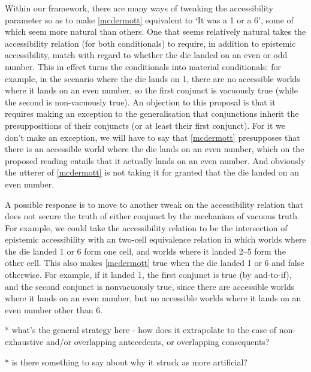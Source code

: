 \documentclass[If.tex]{subfiles}
\begin{document}
Within our framework, there are many ways of tweaking the accessibility parameter so as to make \ref{mcdermott} equivalent to ‘It was a 1 or a 6’, some of which seem more natural than others.  One that seems relatively natural takes the accessibility relation (for both conditionals) to require, in addition to epistemic accessibility, match with regard to whether the die landed on an even or odd number.  This in effect turns the conditionals into material conditionals: for example, in the scenario where the die lands on 1, there are no accessible worlds where it lands on an even number, so the first conjunct is vacuously true (while the second is non-vacuously true).  An objection to this proposal is that it requires making an exception to the generalisation that conjunctions inherit the presuppositions of their conjuncts (or at least their first conjunct).  For it we don't make an exception, we will have to say that \ref{mcdermott} presupposes that there is an accessible world where the die lands on an even number, which on the proposed reading entails that it actually lands on an even number.  And obviously the utterer of \ref{mcdermott} is not taking it for granted that the die landed on an even number.  

A possible response is to move to another tweak on the accessibility relation that does not secure the truth of either conjunct by the mechanism of vacuous truth.  For example, we could take the accessibility relation to be the intersection of epistemic accessibility with an two-cell equivalence relation in which worlds where the die landed 1 or 6 form one cell, and worlds where it landed 2--5 form the other cell.  This also makes \ref{mcdermott} true when the die landed 1 or 6 and false otherwise.  For example, if it landed 1, the first conjunct is true (by and-to-if), and the second conjunct is nonvacuously true, since there are accessible worlds where it lands on an even number, but no accessible worlds where it lands on an even number other than 6.  

* what's the general strategy here - how does it extrapolate to the case of non-exhaustive and/or overlapping antecedents, or overlapping consequents?  

* is there something to say about why it struck as more artificial?  
\end{document}
